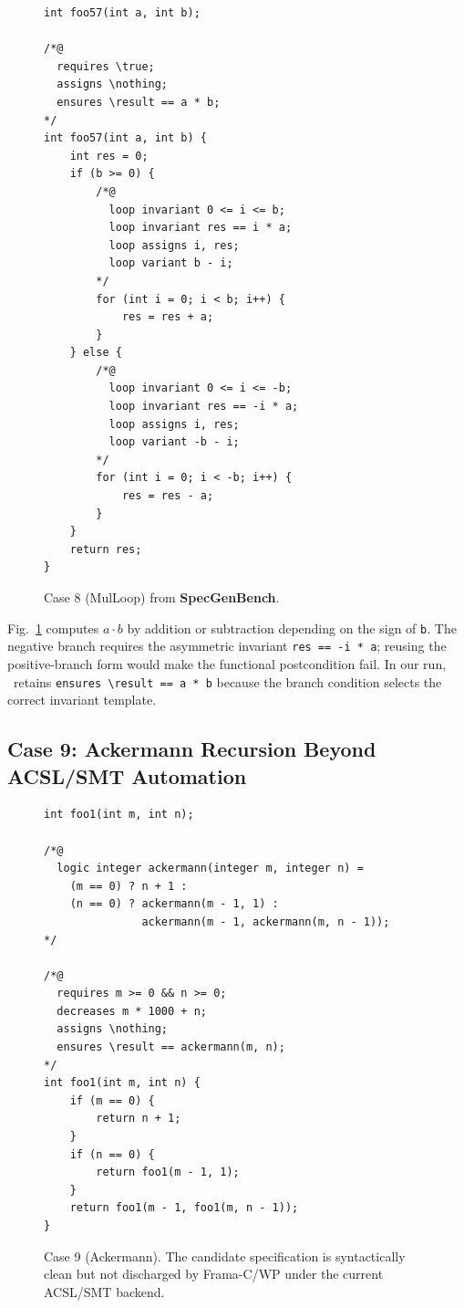 \begin{figure}[!b]
    \centering
    \begin{tcolorbox}[casebox, title={Case 8: signed multiplication loop}]
\begin{lstlisting}[style=casecompactinnerstyle]
int foo57(int a, int b);

/*@
  requires \true;
  assigns \nothing;
  ensures \result == a * b;
*/
int foo57(int a, int b) {
    int res = 0;
    if (b >= 0) {
        /*@
          loop invariant 0 <= i <= b;
          loop invariant res == i * a;
          loop assigns i, res;
          loop variant b - i;
        */
        for (int i = 0; i < b; i++) {
            res = res + a;
        }
    } else {
        /*@
          loop invariant 0 <= i <= -b;
          loop invariant res == -i * a;
          loop assigns i, res;
          loop variant -b - i;
        */
        for (int i = 0; i < -b; i++) {
            res = res - a;
        }
    }
    return res;
}
\end{lstlisting}
    \end{tcolorbox}
    \caption{Case 8 (MulLoop) from \textbf{SpecGenBench}.}
    \label{fig:case6}
\end{figure}

Fig.~\ref{fig:case6} computes $a \cdot b$ by addition or subtraction depending on the sign of \texttt{b}. The negative branch requires the asymmetric invariant \texttt{res == -i * a}; reusing the positive-branch form would make the functional postcondition fail. In our run, \toolname\ retains \texttt{ensures \textbackslash result == a * b} because the branch condition selects the correct invariant template.

\subsection{Case 9: Ackermann Recursion Beyond ACSL/SMT Automation}
\label{app:case-ackermann}

\begin{figure}[!b]
    \centering
    \begin{tcolorbox}[casebox, title={Case 9: Ackermann recursion boundary}]
\begin{lstlisting}[style=casecompactinnerstyle]
int foo1(int m, int n);

/*@
  logic integer ackermann(integer m, integer n) =
    (m == 0) ? n + 1 :
    (n == 0) ? ackermann(m - 1, 1) :
               ackermann(m - 1, ackermann(m, n - 1));
*/

/*@
  requires m >= 0 && n >= 0;
  decreases m * 1000 + n;
  assigns \nothing;
  ensures \result == ackermann(m, n);
*/
int foo1(int m, int n) {
    if (m == 0) {
        return n + 1;
    }
    if (n == 0) {
        return foo1(m - 1, 1);
    }
    return foo1(m - 1, foo1(m, n - 1));
}
\end{lstlisting}
    \end{tcolorbox}
    \caption{Case 9 (Ackermann). The candidate specification is syntactically clean but not discharged by Frama-C/WP under the current ACSL/SMT backend.}
    \label{fig:case8}
\end{figure}


